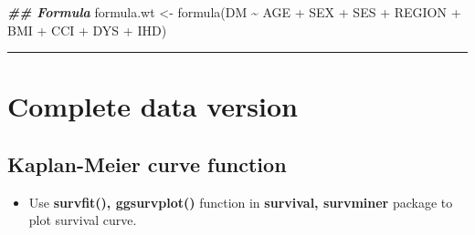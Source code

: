 \documentclass[
]{book}
\newenvironment{Shaded}{\begin{snugshade}}{\end{snugshade}}
\newcommand{\DocumentationTok}[1]{\textcolor[rgb]{0.56,0.35,0.01}{\textbf{\textit{#1}}}}
\newcommand{\FunctionTok}[1]{\textcolor[rgb]{0.00,0.00,0.00}{#1}}
\newcommand{\NormalTok}[1]{#1}
\newcommand{\OtherTok}[1]{\textcolor[rgb]{0.56,0.35,0.01}{#1}}
\newcommand{\SpecialCharTok}[1]{\textcolor[rgb]{0.00,0.00,0.00}{#1}}
\providecommand{\tightlist}{%
  \setlength{\itemsep}{0pt}\setlength{\parskip}{0pt}}
\begin{document}
\begin{Shaded}
\begin{Highlighting}[]
\DocumentationTok{\#\# Formula}
\NormalTok{formula.wt }\OtherTok{\textless{}{-}} \FunctionTok{formula}\NormalTok{(DM }\SpecialCharTok{\textasciitilde{}}\NormalTok{ AGE }\SpecialCharTok{+}\NormalTok{ SEX }\SpecialCharTok{+}\NormalTok{ SES }\SpecialCharTok{+}\NormalTok{ REGION }\SpecialCharTok{+}\NormalTok{ BMI }\SpecialCharTok{+}\NormalTok{ CCI }\SpecialCharTok{+}\NormalTok{ DYS }\SpecialCharTok{+}\NormalTok{ IHD)}
\end{Highlighting}
\end{Shaded}

\begin{center}\rule{0.5\linewidth}{0.5pt}\end{center}

\hypertarget{complete-data-version-2}{%
\section{Complete data version}\label{complete-data-version-2}}

\hypertarget{kaplan-meier-curve-function}{%
\subsection{Kaplan-Meier curve function}\label{kaplan-meier-curve-function}}

\begin{itemize}
\tightlist
\item
  Use \textbf{survfit(), ggsurvplot()} function in \textbf{survival, survminer} package to plot survival curve.
\end{itemize}
\end{document}

